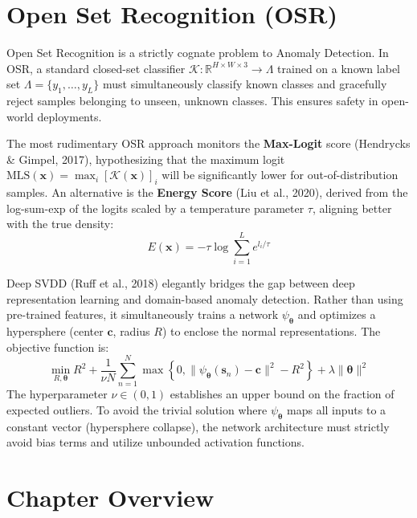\section{Open Set Recognition (OSR)}
Open Set Recognition is a strictly cognate problem to Anomaly Detection. In OSR, a standard closed-set classifier $\mathcal{K}: \mathbb{R}^{H \times W \times 3} \to \Lambda$ trained on a known label set $\Lambda = \{y_1, \dots, y_L\}$ must simultaneously classify known classes and gracefully reject samples belonging to unseen, unknown classes. This ensures safety in open-world deployments.

The most rudimentary OSR approach monitors the \textbf{Max-Logit} score (Hendrycks \& Gimpel, 2017), hypothesizing that the maximum logit $\text{MLS}(\boldsymbol{x}) = \max_i [\mathcal{K}(\boldsymbol{x})]_i$ will be significantly lower for out-of-distribution samples. An alternative is the \textbf{Energy Score} (Liu et al., 2020), derived from the log-sum-exp of the logits scaled by a temperature parameter $\tau$, aligning better with the true density:
\begin{equation}
    E(\boldsymbol{x}) = -\tau \log \sum_{i=1}^L e^{l_i / \tau}
\end{equation}

\begin{insightbox}
Deep SVDD (Ruff et al., 2018) elegantly bridges the gap between deep representation learning and domain-based anomaly detection. Rather than using pre-trained features, it simultaneously trains a network $\psi_{\boldsymbol{\theta}}$ and optimizes a hypersphere (center $\boldsymbol{c}$, radius $R$) to enclose the normal representations. The objective function is:
\begin{equation}
    \min_{R, \boldsymbol{\theta}} R^2 + \frac{1}{\nu N} \sum_{n=1}^N \max \left\{ 0, \| \psi_{\boldsymbol{\theta}}(\boldsymbol{s}_n) - \boldsymbol{c} \|^2 - R^2 \right\} + \lambda \| \boldsymbol{\theta} \|^2
\end{equation}
The hyperparameter $\nu \in (0, 1)$ establishes an upper bound on the fraction of expected outliers. To avoid the trivial solution where $\psi_{\boldsymbol{\theta}}$ maps all inputs to a constant vector (hypersphere collapse), the network architecture must strictly avoid bias terms and utilize unbounded activation functions.
\end{insightbox}

\section{Chapter Overview}

